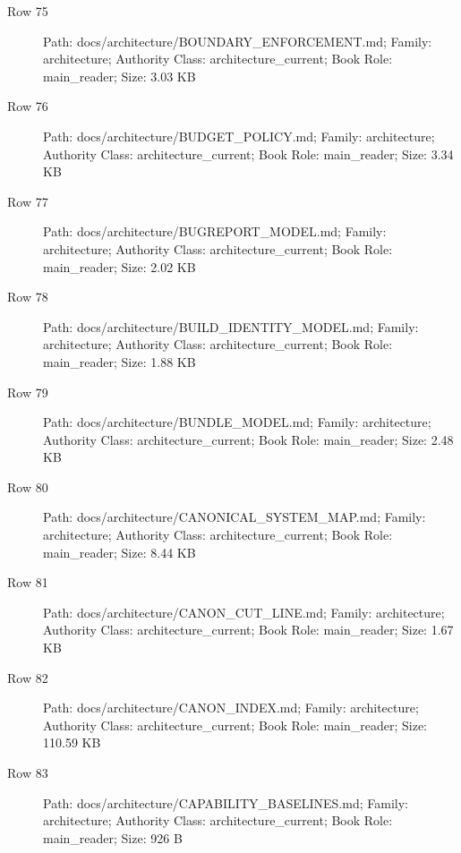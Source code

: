 \documentclass[9pt,a4paper]{book}
\begin{document}
\begin{description}
\item[Row 75] Path: docs/\allowbreak{}architecture/\allowbreak{}BOUNDARY\_\allowbreak{}ENFORCEMENT.\allowbreak{}md; Family: architecture; Authority Class: architecture\_\allowbreak{}current; Book Role: main\_\allowbreak{}reader; Size: 3.\allowbreak{}03 KB
\item[Row 76] Path: docs/\allowbreak{}architecture/\allowbreak{}BUDGET\_\allowbreak{}POLICY.\allowbreak{}md; Family: architecture; Authority Class: architecture\_\allowbreak{}current; Book Role: main\_\allowbreak{}reader; Size: 3.\allowbreak{}34 KB
\item[Row 77] Path: docs/\allowbreak{}architecture/\allowbreak{}BUGREPORT\_\allowbreak{}MODEL.\allowbreak{}md; Family: architecture; Authority Class: architecture\_\allowbreak{}current; Book Role: main\_\allowbreak{}reader; Size: 2.\allowbreak{}02 KB
\item[Row 78] Path: docs/\allowbreak{}architecture/\allowbreak{}BUILD\_\allowbreak{}IDENTITY\_\allowbreak{}MODEL.\allowbreak{}md; Family: architecture; Authority Class: architecture\_\allowbreak{}current; Book Role: main\_\allowbreak{}reader; Size: 1.\allowbreak{}88 KB
\item[Row 79] Path: docs/\allowbreak{}architecture/\allowbreak{}BUNDLE\_\allowbreak{}MODEL.\allowbreak{}md; Family: architecture; Authority Class: architecture\_\allowbreak{}current; Book Role: main\_\allowbreak{}reader; Size: 2.\allowbreak{}48 KB
\item[Row 80] Path: docs/\allowbreak{}architecture/\allowbreak{}CANONICAL\_\allowbreak{}SYSTEM\_\allowbreak{}MAP.\allowbreak{}md; Family: architecture; Authority Class: architecture\_\allowbreak{}current; Book Role: main\_\allowbreak{}reader; Size: 8.\allowbreak{}44 KB
\item[Row 81] Path: docs/\allowbreak{}architecture/\allowbreak{}CANON\_\allowbreak{}CUT\_\allowbreak{}LINE.\allowbreak{}md; Family: architecture; Authority Class: architecture\_\allowbreak{}current; Book Role: main\_\allowbreak{}reader; Size: 1.\allowbreak{}67 KB
\item[Row 82] Path: docs/\allowbreak{}architecture/\allowbreak{}CANON\_\allowbreak{}INDEX.\allowbreak{}md; Family: architecture; Authority Class: architecture\_\allowbreak{}current; Book Role: main\_\allowbreak{}reader; Size: 110.\allowbreak{}59 KB
\item[Row 83] Path: docs/\allowbreak{}architecture/\allowbreak{}CAPABILITY\_\allowbreak{}BASELINES.\allowbreak{}md; Family: architecture; Authority Class: architecture\_\allowbreak{}current; Book Role: main\_\allowbreak{}reader; Size: 926 B

\end{description}
\end{document}
